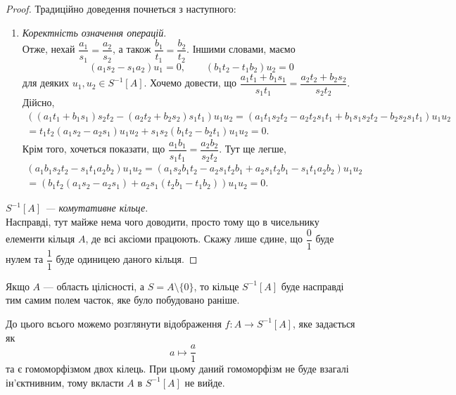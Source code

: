 \documentclass{math_library}
\begin{document}
\begin{proof}
Традиційно доведення почнеться з наступного:
\begin{enumerate}[topsep=0pt,wide=0pt,label={\Roman*.}]
\item \textit{Коректність означення операцій}.\\
Отже, нехай $\dfrac{a_1}{s_1} = \dfrac{a_2}{s_2}$, а також $\dfrac{b_1}{t_1} = \dfrac{b_2}{t_2}$. Іншими словами, маємо
\[
(a_1 s_2 - s_1 a_2) u_1 = 0, \qquad (b_1 t_2 - t_1 b_2) u_2 = 0
\]
для деяких $u_1,u_2 \in S^{-1}[A]$. Хочемо довести, що $\dfrac{a_1 t_1 + b_1 s_1}{s_1 t_1} = \dfrac{a_2 t_2 + b_2 s_2}{s_2 t_2}$. Дійсно,
\begin{align*}
((a_1 t_1 + b_1 s_1) s_2 t_2 - (a_2 t_2 + b_2 s_2) s_1 t_1) u_1 u_2 = (a_1 t_1 s_2 t_2 - a_2 t_2 s_1 t_1 + b_1 s_1 s_2 t_2 - b_2 s_2 s_1 t_1) u_1u_2 \\
= t_1t_2 (a_1 s_2 - a_2 s_1) u_1 u_2 + s_1 s_2(b_1 t_2 - b_2 t_1) u_1 u_2 = 0. 
\end{align*}
Крім того, хочеться показати, що $\dfrac{a_1 b_1}{s_1 t_1} = \dfrac{a_2 b_2}{s_2 t_2}$. Тут ще легше,
\begin{align*}
(a_1 b_1 s_2 t_2 - s_1 t_1 a_2 b_2)u_1u_2 = (a_1 s_2 b_1 t_2 - a_2 s_1 t_2 b_1 + a_2 s_1 t_2 b_1 - s_1 t_1 a_2 b_2)u_1u_2 \\
= (b_1 t_2 (a_1 s_2 - a_2 s_1) + a_2 s_1 (t_2 b_1 - t_1 b_2)) u_1 u_2 = 0.
\end{align*}
\end{enumerate}

\item \textit{$S^{-1}[A]$ --- комутативне кільце}.\\
Насправді, тут майже нема чого доводити, просто тому що в чисельнику елементи кільця $A$, де всі аксіоми працюють. Скажу лише єдине, що $\dfrac{0}{1}$ буде нулем та $\dfrac{1}{1}$ буде одиницею даного кільця.
\end{proof}

\begin{remark}
Якщо $A$ --- область цілісності, а $S = A \setminus \{0\}$, то кільце $S^{-1}[A]$ буде насправді тим самим полем часток, яке було побудовано раніше.
\end{remark}

До цього всього можемо розглянути відображення $f \colon A \to S^{-1}[A]$, яке задається як
\[
a \mapsto \dfrac{a}{1}
\]
та є гомоморфізмом двох кілець. При цьому даний гомоморфізм не буде взагалі ін'єктнивним, тому вкласти $A$ в $S^{-1}[A]$ не вийде.
\end{document}
